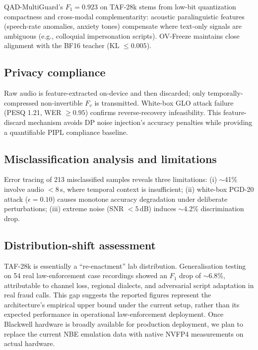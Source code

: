 \documentclass[11pt, a4paper]{article}
\begin{document}
QAD-MultiGuard's $F_1 = 0.923$ on TAF-28k stems from low-bit quantization compactness and cross-modal complementarity: acoustic paralinguistic features (speech-rate anomalies, anxiety tones) compensate where text-only signals are ambiguous (e.g., colloquial impersonation scripts). OV-Freeze maintains close alignment with the BF16 teacher (KL $\le 0.005$).

\subsection{Privacy compliance}

Raw audio is feature-extracted on-device and then discarded; only temporally-compressed non-invertible $F_v$ is transmitted. White-box GLO attack failure (PESQ 1.21, WER $\ge 0.95$) confirms reverse-recovery infeasibility. This feature-discard mechanism avoids DP noise injection's accuracy penalties while providing a quantifiable PIPL compliance baseline.

\subsection{Misclassification analysis and limitations}

Error tracing of 213 misclassified samples reveals three limitations: (i) $\sim$41\% involve audio $<8$\,s, where temporal context is insufficient; (ii) white-box PGD-20 attack ($\epsilon = 0.10$) causes monotone accuracy degradation under deliberate perturbations; (iii) extreme noise (SNR $<5$\,dB) induces $\sim$4.2\% discrimination drop.

\subsection{Distribution-shift assessment}

TAF-28k is essentially a ``re-enactment'' lab distribution. Generalisation testing on 54 real law-enforcement case recordings showed an $F_1$ drop of $\sim$6.8\%, attributable to channel loss, regional dialects, and adversarial script adaptation in real fraud calls. This gap suggests the reported figures represent the architecture's empirical upper bound under the current setup, rather than its expected performance in operational law-enforcement deployment. Once Blackwell hardware is broadly available for production deployment, we plan to replace the current NBE emulation data with native NVFP4 measurements on actual hardware.

\end{document}
